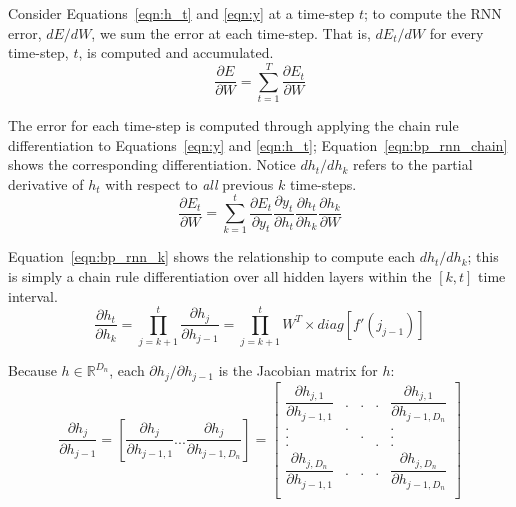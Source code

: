 \documentclass{tufte-handout}
\begin{document}
Consider Equations~\ref{eqn:h_t} and \ref{eqn:y} at a time-step $t$; to compute the RNN error, $dE/dW$, we sum the error at each time-step. That is, $dE_t/dW$ for every time-step, $t$, is computed and accumulated.
\begin{equation}
	\dfrac{\partial E}{\partial W} = \sum_{t=1}^{T}\dfrac{\partial E_t}{\partial W}
	\label{eqn:bp_rnn_error}
\end{equation}

The error for each time-step is computed through applying the chain rule differentiation to Equations~\ref{eqn:y} and \ref{eqn:h_t}; Equation~\ref{eqn:bp_rnn_chain} shows the corresponding differentiation. Notice $dh_t/dh_k$ refers to the partial derivative of $h_t$ with respect to \textit{all} previous $k$ time-steps. 
\begin{equation}
	\dfrac{\partial E_t}{\partial W} = \sum_{k=1}^{t} \dfrac{\partial E_t}{\partial y_t} \dfrac{\partial y_t}{\partial h_t} \dfrac{\partial h_t}{\partial h_k} \dfrac{\partial h_k}{\partial W}
	\label{eqn:bp_rnn_chain}
\end{equation}

Equation~\ref{eqn:bp_rnn_k} shows the relationship to compute each $dh_t/dh_k$; this is simply a chain rule differentiation over all hidden layers within the $[k, t]$ time interval. 
\begin{equation}
	\dfrac{\partial h_t}{\partial h_k} = \prod_{j=k+1}^{t}\dfrac{\partial h_j}{\partial h_{j-1}} = \prod_{j=k+1}^{t}W^T \times diag [f'(j_{j-1})]
	\label{eqn:bp_rnn_k}
\end{equation}

Because $h \in \mathbb{R}^{D_n}$, each $\partial h_j/\partial h_{j-1}$ is the Jacobian matrix for $h$:
\begin{equation}
	\dfrac{\partial h_j}{\partial h_{j-1}} = {[\dfrac{\partial h_{j}}{\partial h_{j-1,1}} ...  \dfrac{\partial h_{j}}{\partial h_{j-1,D_n}}]} = 
	\begin{bmatrix}
	\dfrac{\partial h_{j,1}}{\partial h_{j-1,1}} & . & . & . & \dfrac{\partial h_{j,1}}{\partial h_{j-1,D_n}} \\
	. & . & & & . \\
	. & & . & & . \\
	. & & & . & . \\
	\dfrac{\partial h_{j,D_n}}{\partial h_{j-1,1}} & . & . & . & \dfrac{\partial h_{j,D_n}}{\partial h_{j-1,D_n}} \\
	\end{bmatrix}
	\label{eqn:bp_rnn_jaocb}
\end{equation}
\end{document}
